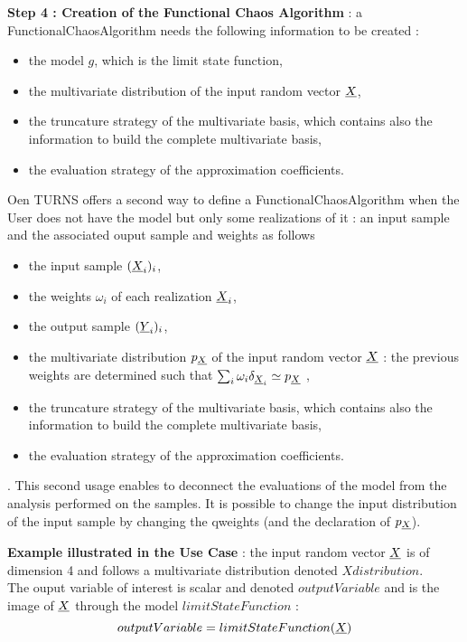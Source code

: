 \vspace*{0.1cm}

{\bf Step 4 : Creation of the Functional Chaos Algorithm} : a FunctionalChaosAlgorithm needs the following information to be created :
\begin{itemize}
\item the model $g$, which is the limit state function,
\item the multivariate distribution of the input random vector ${\underline{X}}$,
\item the truncature strategy of the multivariate basis, which contains also the information to build the complete multivariate basis,
\item the evaluation strategy of the approximation coefficients.
\end{itemize}
Oen TURNS offers a second way to define a FunctionalChaosAlgorithm when the User does not have the model but only some realizations of it : an input sample and the associated ouput sample and weights  as follows 
\begin{itemize}
\item the input sample $({\underline{X}}_i)_i$,
\item the weights $\omega_i$ of each realization ${\underline{X}}_i$,
\item the output sample $({\underline{Y}}_i)_i$, 
\item the multivariate distribution $p_{{\underline{X}}}$ of the input random vector ${\underline{X}}$ : the previous weights are determined such that $\sum_i \omega_i \delta_{{\underline{X}}_i} \simeq p_{{\underline{X}}}$ ,
\item the truncature strategy of the multivariate basis, which contains also the information to build the complete multivariate basis,
\item the evaluation strategy of the approximation coefficients.
\end{itemize}.
This second usage enables to deconnect the evaluations of the model from the analysis performed on the samples. It is possible to change the input distribution of the input sample by changing the qweights (and the declaration of   $p_{{\underline{X}}}$).
\vspace*{0.1cm}

{\bf Example illustrated in the Use Case} : the input random vector ${\underline{X}}$ is of dimension 4 and follows a multivariate distribution denoted $Xdistribution$.\\
The ouput variable of interest is scalar and denoted $outputVariable$ and is the image of ${\underline{X}}$ through the model $limitStateFunction$ : $$
outputVariable = limitStateFunction({\underline{X}})
$$

